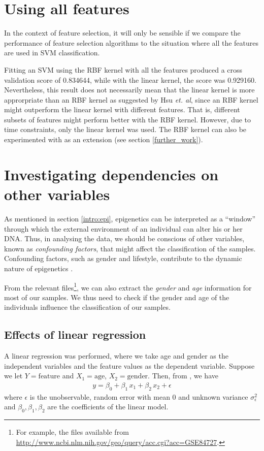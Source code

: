 \documentclass[12pt, twoside, a4paper]{report}
\begin{document}
\section{Using all features} \label{data:all_features}

In the context of feature selection, it will only be sensible if we compare the performance of feature selection algorithms to the situation where all the features are used in SVM classification.


Fitting an SVM using the RBF kernel with all the features produced a cross validation score of 0.834644, while with the linear kernel, the score was 0.929160. Nevertheless, this result does not necessarily mean that the linear kernel is more approrpriate than an RBF kernel as suggested by Hsu \textit{et. al}, since an RBF kernel might outperform the linear kernel with different features. That is, different subsets of features might perform better with the RBF kernel. However, due to time constraints, only the linear kernel was used. The RBF kernel can also be experimented with as an extension (see section \ref{further_work}).

\section{Investigating dependencies on other variables}

As mentioned in section \ref{intro:epi}, epigenetics can be interpreted as a ``window'' through which the external environment of an individual can alter his or her DNA. Thus, in analysing the data, we should be conscious of other variables, known as \textit{confounding factors}, that might affect the classification of the samples. Confounding factors, such as gender and lifestyle, contribute to the dynamic nature of epigenetics \cite{RefWorks:78}.

From the relevant files\footnote{For example, the files available from \url{http://www.ncbi.nlm.nih.gov/geo/query/acc.cgi?acc=GSE84727}.}, we can also extract the \textit{gender} and \textit{age} information for most of our samples. We thus need to check if the gender and age of the individuals influence the classification of our samples.

\subsection{Effects of linear regression}
A linear regression was performed, where we take age and gender as the independent variables and the feature values as the dependent variable. Suppose we let $Y=\text{feature}$ and $X_1=\text{age}$, $X_2=\text{gender}$. Then, from \cite{RefWorks:219}, we have
\begin{align*}
y = \beta_0 + \beta_1 \, x_1 + \beta_2 \, x_2 + \epsilon
\end{align*}
where $\epsilon$ is the unobservable, random error with mean 0 and unknown variance $\sigma_\epsilon^2$ and $\beta_0, \beta_1, \beta_2$ are the coefficients of the linear model.
\end{document}
